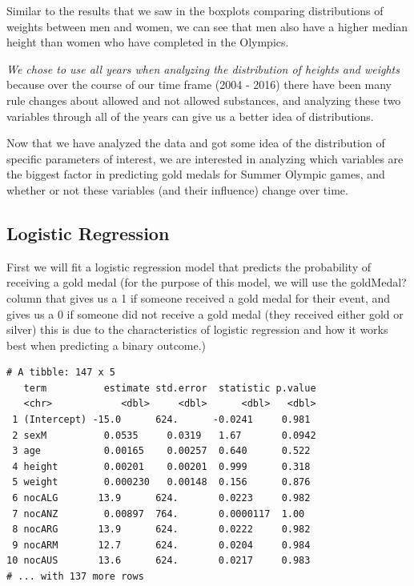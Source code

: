 \documentclass[
  letterpaper,
  DIV=11,
  numbers=noendperiod]{scrartcl}
\begin{document}
Similar to the results that we saw in the boxplots comparing
distributions of weights between men and women, we can see that men also
have a higher median height than women who have completed in the
Olympics.

\emph{We chose to use all years when analyzing the distribution of
heights and weights} because over the course of our time frame (2004 -
2016) there have been many rule changes about allowed and not allowed
substances, and analyzing these two variables through all of the years
can give us a better idea of distributions.

Now that we have analyzed the data and got some idea of the distribution
of specific parameters of interest, we are interested in analyzing which
variables are the biggest factor in predicting gold medals for Summer
Olympic games, and whether or not these variables (and their influence)
change over time.

\hypertarget{logistic-regression}{%
\subsection{Logistic Regression}\label{logistic-regression}}

First we will fit a logistic regression model that predicts the
probability of receiving a gold medal (for the purpose of this model, we
will use the goldMedal? column that gives us a 1 if someone received a
gold medal for their event, and gives us a 0 if someone did not receive
a gold medal (they received either gold or silver) this is due to the
characteristics of logistic regression and how it works best when
predicting a binary outcome.)

\begin{verbatim}
# A tibble: 147 x 5
   term          estimate std.error  statistic p.value
   <chr>            <dbl>     <dbl>      <dbl>   <dbl>
 1 (Intercept) -15.0      624.      -0.0241     0.981 
 2 sexM          0.0535     0.0319   1.67       0.0942
 3 age           0.00165    0.00257  0.640      0.522 
 4 height        0.00201    0.00201  0.999      0.318 
 5 weight        0.000230   0.00148  0.156      0.876 
 6 nocALG       13.9      624.       0.0223     0.982 
 7 nocANZ        0.00897  764.       0.0000117  1.00  
 8 nocARG       13.9      624.       0.0222     0.982 
 9 nocARM       12.7      624.       0.0204     0.984 
10 nocAUS       13.6      624.       0.0217     0.983 
# ... with 137 more rows
\end{verbatim}
\end{document}
